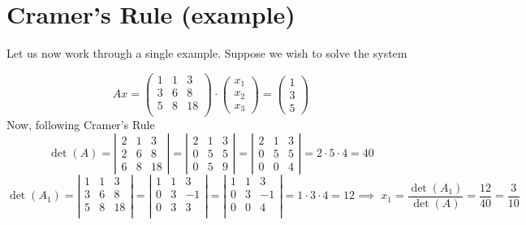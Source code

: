 \documentclass[8pt]{article} %
\begin{document}
\section{Cramer's Rule (example)}
Let us now work through a single example. Suppose we wish to solve the system
\begin{myeg}
\[Ax=
\left(\begin{array}{rrr}
1&1&3\\
3&6&8\\
5&8&18\\
\end{array}\right)\cdot\begin{pmatrix}x_1\\x_2\\x_3\end{pmatrix}=\begin{pmatrix}1\\3\\5\end{pmatrix}\]
Now, following Cramer's Rule
\[\det(A)=
\left|\begin{array}{rrr}
	2&1&3\\2&6&8\\6&8&18
\end{array}\right|=
\left|\begin{array}{rrr}
	2&1&3\\0&5&5\\0&5&9
\end{array}\right|=
\left|\begin{array}{rrr}
	2&1&3\\0&5&5\\0&0&4
\end{array}\right|=2\cdot5\cdot4=40
\]
\[\det(A_1)=\left|\begin{array}{rrr}1&1&3\\3&6&8\\5&8&18\\
\end{array}\right|=
\left|\begin{array}{rrr}1&1&3\\0&3&-1\\0&3&3\\\end{array}\right|=\left|\begin{array}{rrr}1&1&3\\0&3&-1\\0&0&4\\\end{array}\right|=1\cdot3\cdot4=12
	\implies\;x_1=\frac{\det(A_1)}{\det(A)}=\frac{12}{40}=\frac{3}{10}\]

\end{myeg}
\end{document}
